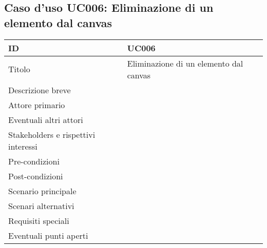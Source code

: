 \documentclass[../../main.tex]{subfiles}
\begin{document}
\subsection{Caso d’uso UC006: Eliminazione di un elemento dal canvas}
\begin{tabularx}{150mm}{|l|X|}
    \hline
    ID                                  & \textbf{UC006}\\
    \hline
    Titolo                              & Eliminazione di un elemento dal canvas\\
    \hline
    Descrizione breve                   &    \\
    \hline
    Attore primario                     &    \\
    \hline
    Eventuali altri attori              &    \\
    \hline
    Stakeholders e rispettivi interessi &    \\
    \hline
    Pre-condizioni                      &    \\
    \hline
    Post-condizioni                     &    \\
    \hline
    Scenario principale                 &    \\
    \hline
    Scenari alternativi                 &    \\
    \hline
    Requisiti speciali                  &    \\
    \hline
    Eventuali punti aperti              &    \\
    \hline
\end{tabularx}
\newpage
\end{document}
